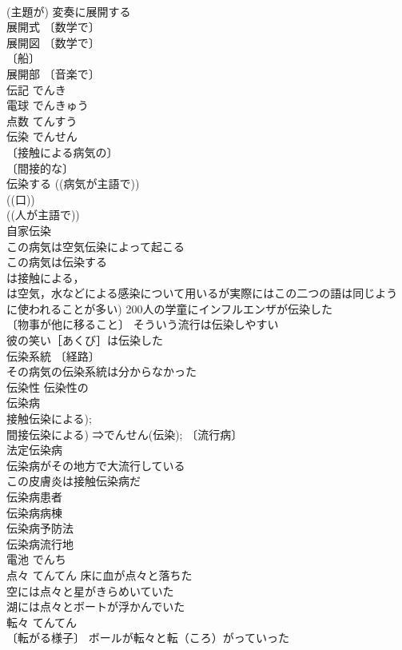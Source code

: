 \documentclass[8pt]{extreport}
\begin{document}
\begin{CJK}{UTF8}{min}
\\	(主題が) 変奏に展開する 
\\	展開式 〔数学で〕
\\	展開図 〔数学で〕
\\	〔船〕
\\	展開部 〔音楽で〕
\\	伝記	でんき	
\\	電球	でんきゅう	
\\	点数	てんすう	
\\	伝染	でんせん	
\\	〔接触による病気の〕
\\	〔間接的な〕
\\	伝染する ((病気が主語で)) 
\\	((口)) 
\\	((人が主語で)) 
\\	自家伝染 
\\	この病気は空気伝染によって起こる 
\\	この病気は伝染する 
\\	は接触による，
\\	は空気，水などによる感染について用いるが実際にはこの二つの語は同じよう に使われることが多い) 200人の学童にインフルエンザが伝染した 
\\	〔物事が他に移ること〕 そういう流行は伝染しやすい 
\\	彼の笑い［あくび］は伝染した 
\\	伝染系統 〔経路〕
\\	その病気の伝染系統は分からなかった 
\\	伝染性 伝染性の 
\\	伝染病 
\\	接触伝染による); 
\\	間接伝染による) ⇒でんせん(伝染); 〔流行病〕
\\	法定伝染病 
\\	伝染病がその地方で大流行している 
\\	この皮膚炎は接触伝染病だ 
\\	伝染病患者 
\\	伝染病病棟 
\\	伝染病予防法 
\\	伝染病流行地 
\\	電池	でんち	
\\	点々	てんてん	床に血が点々と落ちた 
\\	空には点々と星がきらめいていた 
\\	湖には点々とボートが浮かんでいた 
\\	転々	てんてん	
\\	〔転がる様子〕 ボールが転々と転（ころ）がっていった 

\end{CJK}
\end{document}

